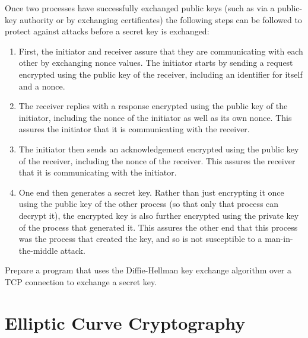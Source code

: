 Once two processes have successfully exchanged public keys
(such as via a public-key authority or by exchanging certificates)
the following steps can be followed to protect against attacks
before a secret key is exchanged:
\begin{enumerate}
  \item First, the initiator and receiver assure that they are communicating
  with each other by exchanging nonce values. The initiator starts by sending
  a request encrypted using the public key of the receiver,
  including an identifier for itself and a nonce.

  \item The receiver replies with a response encrypted using the public key
  of the initiator, including the nonce of the initiator as well as
  its own nonce. This assures the initiator that it is communicating with
  the receiver.

  \item The initiator then sends an acknowledgement encrypted using the
  public key of the receiver, including the nonce of the receiver.
  This assures the receiver that it is communicating with the initiator.

  \item One end then generates a secret key. Rather than just encrypting it once
  using the public key of the other process (so that only that process can decrypt
  it), the encrypted key is also further encrypted using the private key of the
  process that generated it. This assures the other end that this process
  was the process that created the key, and so is not susceptible to a
  man-in-the-middle attack.
\end{enumerate}


\begin{exercise}
Prepare a program that uses the Diffie-Hellman key exchange algorithm over a
TCP connection to exchange a secret key.
\end{exercise}



\section{Elliptic Curve Cryptography}\label{Se:EllipticCurveCryptography}

